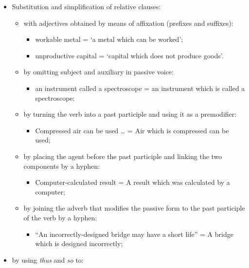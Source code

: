 \begin{itemize}

\item Substitution and simplification of relative clauses:

\begin{itemize}

\item with adjectives obtained by means of affixation (prefixes and suffixes):

\begin{itemize}
\item workable metal = ‘a metal which can be worked’;
\item unproductive capital = ‘capital which does not produce goods’.
\end{itemize}

\item by omitting subject and auxiliary in passive voice:
\begin{itemize}
\item an instrument called a spectroscope = an instrument which is called a spectroscope;
\end{itemize}

\item by turning the verb into a past participle and using it as a premodifier:
\begin{itemize}
\item Compressed air can be used … = Air which is compressed can be used;
\end{itemize}
\item by placing the agent before the past participle and linking the two components by a hyphen:

\begin{itemize}
\item Computer-calculated result = A result which was calculated by a computer;
\end{itemize}

\item by joining the adverb that modifies the passive form to the past participle of the verb by a hyphen:

\begin{itemize}
\item “An incorrectly-designed bridge may have a short life” = A bridge which is designed incorrectly;
\end{itemize}

\end{itemize}

\item by using \textit{thus} and \textit{so} to:


\end{itemize}
